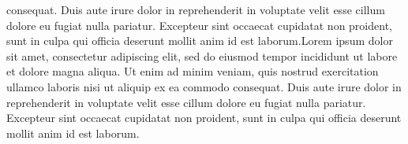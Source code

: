 \documentclass[10pt,journal,compsoc]{IEEEtran}
\begin{document}
consequat. Duis aute irure dolor in reprehenderit in voluptate velit esse cillum dolore eu fugiat nulla pariatur. Excepteur sint occaecat cupidatat non proident, sunt in culpa qui officia deserunt mollit anim id est laborum.Lorem ipsum dolor sit amet, consectetur adipiscing elit, sed do eiusmod tempor incididunt ut labore et dolore magna aliqua. Ut enim ad minim veniam, quis nostrud exercitation ullamco laboris nisi ut aliquip ex ea commodo consequat. Duis aute irure dolor in reprehenderit in voluptate velit esse cillum dolore eu fugiat nulla pariatur. Excepteur sint occaecat cupidatat non proident, sunt in culpa qui officia deserunt mollit anim id est laborum.




%


\appendices
\end{document}
